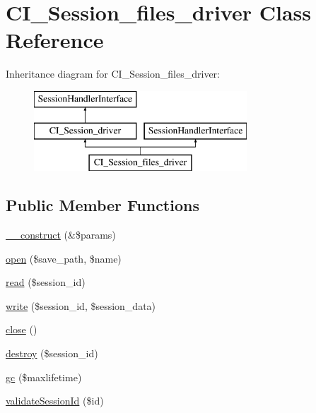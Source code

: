 \hypertarget{class_c_i___session__files__driver}{}\section{C\+I\+\_\+\+Session\+\_\+files\+\_\+driver Class Reference}
\label{class_c_i___session__files__driver}
Inheritance diagram for C\+I\+\_\+\+Session\+\_\+files\+\_\+driver\+:\begin{figure}[H]
\begin{center}
\leavevmode
\includegraphics[height=3.000000cm]{class_c_i___session__files__driver}
\end{center}
\end{figure}
\subsection*{Public Member Functions}
\begin{DoxyCompactItemize}
\item 
\mbox{\hyperlink{class_c_i___session__files__driver_a3696fdd1e0a652209438d79569935332}{\+\_\+\+\_\+construct}} (\&\$params)
\item 
\mbox{\hyperlink{class_c_i___session__files__driver_aea7206200a1f37bcceb11f04465e358d}{open}} (\$save\+\_\+path, \$name)
\item 
\mbox{\hyperlink{class_c_i___session__files__driver_a7d48179262e244006fd162f0d65b9921}{read}} (\$session\+\_\+id)
\item 
\mbox{\hyperlink{class_c_i___session__files__driver_a6680846c3c0bca561189add5daa87180}{write}} (\$session\+\_\+id, \$session\+\_\+data)
\item 
\mbox{\hyperlink{class_c_i___session__files__driver_a3a6ae13966e0721deb3d519f3dd29c32}{close}} ()
\item 
\mbox{\hyperlink{class_c_i___session__files__driver_a6a57b41c390e04a7af89e31b13b1ba60}{destroy}} (\$session\+\_\+id)
\item 
\mbox{\hyperlink{class_c_i___session__files__driver_aede798f406b1aa4c059f5da7ec72c4a7}{gc}} (\$maxlifetime)
\item 
\mbox{\hyperlink{class_c_i___session__files__driver_af046844374c973dc5f414ac2ad301dd3}{validate\+Session\+Id}} (\$id)
\end{DoxyCompactItemize}
